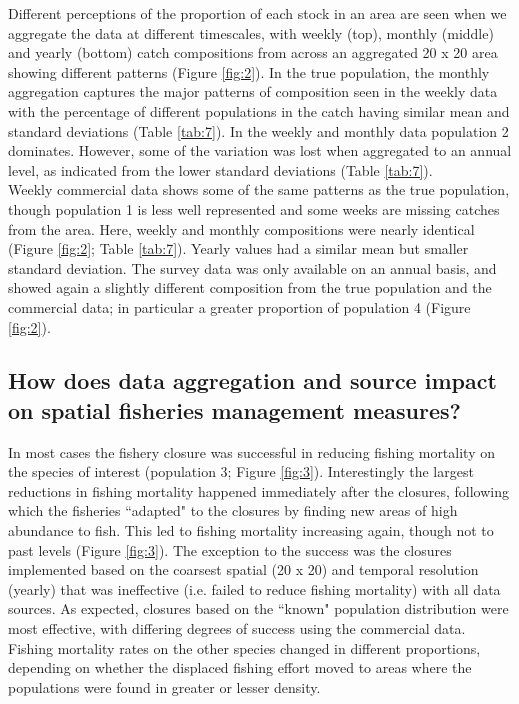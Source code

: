 \documentclass[preprint]{elsarticle}
\begin{document}
Different perceptions of the proportion of each stock in an area are seen when
we aggregate the data at different timescales, with weekly (top), monthly
(middle) and yearly (bottom) catch compositions from across an aggregated 20 x
20 area showing different patterns (Figure \ref{fig:2}). In the true
population, the monthly aggregation captures the major patterns of composition
seen in the weekly data with the percentage of different populations in the
catch having similar mean and standard deviations (Table \ref{tab:7}). In the
weekly and monthly data population 2 dominates. However, some of the variation
was lost when aggregated to an annual level, as indicated from the lower
standard deviations (Table \ref{tab:7}).\\

Weekly commercial data shows some of the same patterns as the true population,
though population 1 is less well represented and some weeks are missing catches
from the area. Here, weekly and monthly compositions were nearly identical
(Figure \ref{fig:2}; Table \ref{tab:7}). Yearly values had a similar mean but
smaller standard deviation. The survey data was only available on an annual
basis, and showed again a slightly different composition from the true
population and the commercial data; in particular a greater proportion of
population 4 (Figure \ref{fig:2}).

\subsection{How does data aggregation and source impact on spatial fisheries
	management measures?}

In most cases the fishery closure was successful in reducing fishing mortality
on the species of interest (population 3; Figure \ref{fig:3}). Interestingly
the largest reductions in fishing mortality happened immediately after the
closures, following which the fisheries ``adapted" to the closures by finding
new areas of high abundance to fish. This led to fishing mortality increasing
again, though not to past levels (Figure \ref{fig:3}). The exception to the
success was the closures implemented based on the coarsest spatial (20 x 20)
and temporal resolution (yearly) that was ineffective (i.e. failed to reduce
fishing mortality) with all data sources. As expected, closures based on the
``known" population distribution were most effective, with differing degrees of
success using the commercial data. Fishing mortality rates on the other species
changed in different proportions, depending on whether the displaced fishing
effort moved to areas where the populations were found in greater or lesser
density. \\
\end{document}
